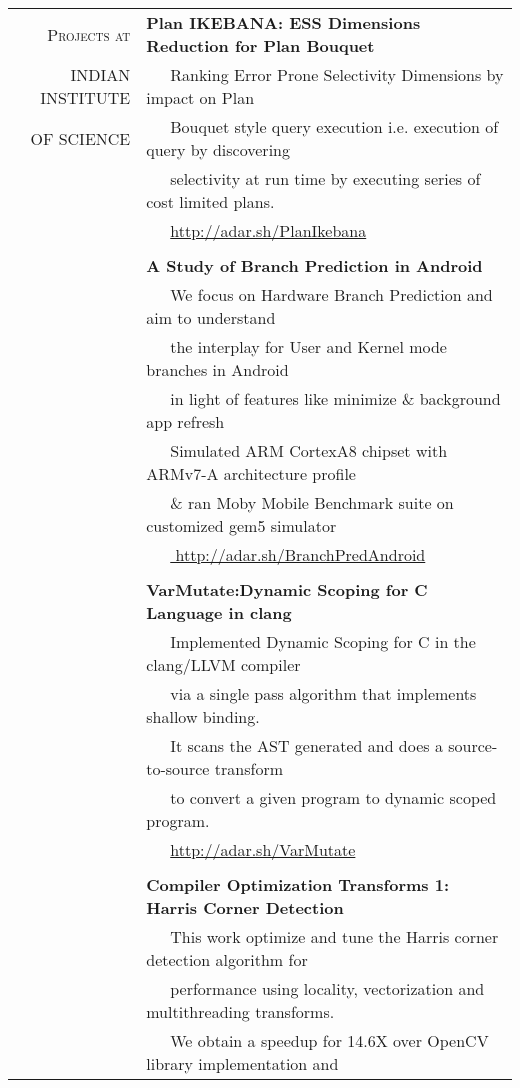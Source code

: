 \documentclass[a4paper,10pt]{article} %
\begin{document}
\begin{tabular}{rl}
\textsc{Projects at} & \textbf{Plan IKEBANA: ESS Dimensions Reduction for Plan Bouquet} \\
\textsc{INDIAN INSTITUTE} & ~~~Ranking Error Prone Selectivity Dimensions by impact on Plan\\
\textsc{OF SCIENCE}& ~~~Bouquet style query execution i.e. execution of query by discovering \\
& ~~~selectivity at run time by executing series of cost limited plans.\\
& ~~~\href{http://adar.sh/PlanIkebana}{http://adar.sh/PlanIkebana}\\
& \\
& \textbf{A Study of Branch Prediction in Android} \\
& ~~~We focus on Hardware Branch Prediction and aim to understand\\
& ~~~the interplay for User and Kernel mode branches in Android\\
& ~~~in light of features like minimize \& background app refresh\\
& ~~~Simulated ARM CortexA8 chipset with ARMv7-A architecture profile\\
& ~~~\& ran Moby Mobile Benchmark suite on customized gem5 simulator\\
& ~~~\href{http://adar.sh/BranchPredAndroid}{ http://adar.sh/BranchPredAndroid} \\
&\\
& \textbf{VarMutate:Dynamic Scoping for C Language in clang}\\
& ~~~Implemented Dynamic Scoping for C in the clang/LLVM compiler\\
& ~~~via a single pass algorithm that implements shallow binding.\\
& ~~~It scans the AST generated and does a source-to-source transform\\
& ~~~to convert a given program to dynamic scoped program.\\
& ~~~\href{http://adar.sh/VarMutate}{http://adar.sh/VarMutate} \\
& \\
& \textbf{Compiler Optimization Transforms 1: Harris Corner Detection}\\
& ~~~This work optimize and tune the Harris corner detection algorithm for \\
& ~~~performance using locality, vectorization and multithreading transforms. \\
& ~~~We obtain a speedup for 14.6X over OpenCV library implementation and \\

\end{tabular}
\end{document}
